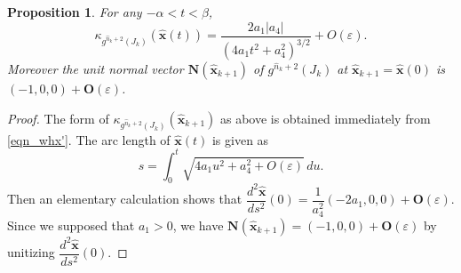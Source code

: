 \documentclass{amsart}
\newtheorem{prop}[thm]{Proposition}
\theoremstyle{definition}
\numberwithin{equation}{section}
\numberwithin{figure}{section}
\begin{document}
\begin{prop}\label{p_kappa_fn}
For any $-\alpha<t<\beta$, 
$$
\kappa_{g^{\widehat n_k+2}(J_k)}(\widehat{\boldsymbol{x}}(t))=\frac{2a_1|a_4|}{(4a_1t^2+a_4^2)^{3/2}}+O(\varepsilon).$$
Moreover the unit normal vector $\boldsymbol{N}(\widehat{\boldsymbol{x}}_{k+1})$ of $g^{\widehat n_k+2}(J_k)$ at $\widehat{ \boldsymbol{x}}_{k+1}=\widehat{\boldsymbol{x}}(0)$ is 
$(-1,0,0)+\boldsymbol{O}(\varepsilon)$.
\end{prop}
\begin{proof}
The form of $\kappa_{g^{\widehat n_k+2}(J_k)}(\widehat{\boldsymbol{x}}_{k+1})$ as above is obtained immediately from \eqref{eqn_whx'}.
The arc length of $\widehat{\boldsymbol{x}}(t)$ is given as 
$$s=\int_0^t\sqrt{4a_1u^2+a_4^2 +O(\varepsilon)}\,du.$$
Then an elementary calculation shows 
that $\dfrac{d^2\widehat{\boldsymbol{x}}}{ds^2}(0)=\dfrac1{a_4^2}(-2a_1,0,0)+\boldsymbol{O}(\varepsilon)$.
Since we supposed that $a_1>0$, we have $\boldsymbol{N}(\widehat{\boldsymbol{x}}_{k+1})=(-1,0,0)+\boldsymbol{O}(\varepsilon)$ 
by unitizing $\dfrac{d^2\widehat{\boldsymbol{x}}}{ds^2}(0)$.
\end{proof}








%
%
%





\printindex
\end{document}
